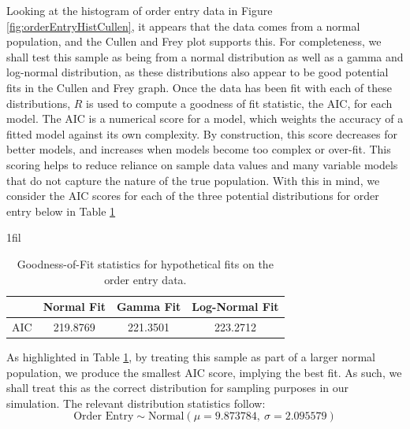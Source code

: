 \documentclass[10pt]{report}            %
\makeatletter
\newcommand*{\centerfloat}{%
  \parindent \z@
  \leftskip \z@ \@plus 1fil \@minus \textwidth
  \rightskip\leftskip
  \parfillskip \z@skip}
\makeatother
\begin{document}
Looking at the histogram of order entry data in Figure \ref{fig:orderEntryHistCullen}, it appears that the data comes from a normal population, and the Cullen and Frey plot supports this. For completeness, we shall test this sample as being from a normal distribution as well as a gamma and log-normal distribution, as these distributions also appear to be good potential fits in the Cullen and Frey graph. Once the data has been fit with each of these distributions, $R$ is used to compute a goodness of fit statistic, the AIC, for each model. The AIC is a numerical score for a model, which weights the accuracy of a fitted model against its own complexity. By construction, this score decreases for better models, and increases when models become too complex or over-fit. This scoring helps to reduce reliance on sample data values and many variable  models that do not capture the nature of the true population. With this in mind, we consider the AIC scores for each of the three potential distributions for order entry below in Table \ref{table:entryGOF}
\begin{table}[H]
\centerfloat
\begin{tabular}{|r||c|c|c|}
\hline
& Normal Fit & Gamma Fit & Log-Normal Fit \\\hline
AIC & \cellcolor{green!25}219.8769 & 221.3501 & 223.2712\\\hline
\end{tabular}
\caption{Goodness-of-Fit statistics for hypothetical fits on the order entry data.}
\label{table:entryGOF}
\end{table}
As highlighted in Table \ref{table:entryGOF}, by treating this sample as part of a larger normal population, we produce the smallest AIC score, implying the best fit. As such, we shall treat this as the correct distribution for sampling purposes in our simulation. The relevant distribution statistics follow:
\[\text{Order Entry}\sim \text{Normal}(\mu=9.873784,\ \sigma=2.095579)\]
\end{document}
